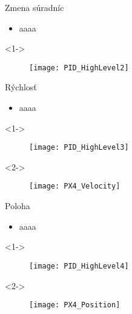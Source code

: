 \documentclass{beamer}
\begin{document}
  \begin{frame}[t]{Zmena súradníc}
\begin{itemize}
  \item<1-> aaaa
\end{itemize}

  \begin{onlyenv}<1->
  \begin{figure}
\centering
  \texttt{[image: PID\_HighLevel2]}\\
\end{figure}
\end{onlyenv}

  \end{frame}



  \begin{frame}[t]{Rýchlosť}
\begin{itemize}
  \item<1-> aaaa
\end{itemize}

  \begin{onlyenv}<1->
  \begin{figure}
\centering
  \texttt{[image: PID\_HighLevel3]}\\
\end{figure}
\end{onlyenv}


  \begin{onlyenv}<2->
  \begin{figure}
\centering
  \texttt{[image: PX4\_Velocity]}\\
\end{figure}
\end{onlyenv}

  \end{frame}


 \begin{frame}[t]{Poloha}
\begin{itemize}
  \item<1-> aaaa
\end{itemize}

  \begin{onlyenv}<1->
  \begin{figure}
\centering
  \texttt{[image: PID\_HighLevel4]}\\
\end{figure}
\end{onlyenv}


  \begin{onlyenv}<2->
  \begin{figure}
\centering
  \texttt{[image: PX4\_Position]}\\
\end{figure}
\end{onlyenv}
  \end{frame}
\end{document}
